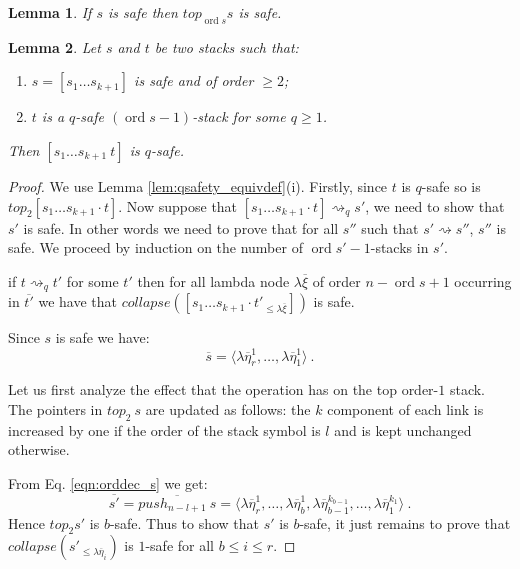 \documentclass{article}
\newcommand{\ord}{\mathop{\mathrm{ord}}}
\newcommand{\prefixof}{\leqslant}
\newtheorem{lemma}{Lemma}[section]
\theoremstyle{remark}
\theoremstyle{definition}
\newcommand\orddec\overline
\newcommand\saferel\rightsquigarrow
\begin{document}
\begin{lemma}
\label{lem:top_qsafe} If $s$ is safe then $top_{\ord{s}} s$ is safe.
\end{lemma}

\begin{lemma}
\label{lem:cons_qsafety} Let $s$ and $t$ be two stacks such that:
\begin{enumerate}[1.]
\item $s = [s_1 \ldots s_{k+1}]$ is safe and of order $\geq 2$;
\item $t$ is a $q$-safe $(\ord{s}-1)$-stack for some $q\geq1$.
\end{enumerate}
Then $[s_1 \ldots s_{k+1}~ t]$ is $q$-safe.
\end{lemma}
\begin{proof}
We use Lemma \ref{lem:qsafety_equivdef}(i). Firstly, since $t$ is
$q$-safe so is $top_2 [s_1 \ldots s_{k+1} \cdot t]$. Now suppose
that $[s_1 \ldots s_{k+1} \cdot t] \saferel_q s'$, we need to show
that $s'$ is safe. In other words we need to prove that for all
$s''$ such that $s' \saferel s''$, $s''$ is safe. We proceed by
induction on the number of $\ord{s'}-1$-stacks in $s'$.

\hrulefill

 if $t\saferel_q t'$ for some $t'$ then for all lambda node
$\lambda \overline{\xi}$ of order $n-\ord{s}+1$ occurring in
$\orddec{t'}$ we have that $collapse([s_1 \ldots s_{k+1} \cdot
t'_{\prefixof{\lambda \overline{\xi}}}])$ is safe.


\hrulefill

Since $s$ is safe we have:
\begin{equation}
 \orddec{s} = \langle \lambda \overline{\eta}_r^1
, \ldots, \lambda \overline{\eta}_1^1   \rangle \ . \label{eqn:orddec_s}
\end{equation}

Let us first analyze the effect that the operation has on the top
order-$1$ stack. The pointers in $top_2\ s$ are updated as follows:
the $k$ component of each link is increased by one if the order of
the stack symbol is $l$ and is kept unchanged otherwise.

From Eq. \ref{eqn:orddec_s} we get:
\begin{equation}
\orddec{s'} = \orddec{push_{n-l+1}\ s} = \langle
\lambda \overline{\eta}_r^1
, \ldots,  \lambda \overline{\eta}_{b}^1, \lambda \overline{\eta}_{b-1}^{k_{b-1}}, \ldots,
 \lambda \overline{\eta}_1^{k_{1}} \rangle
\ . \label{eqn:orddec_pushj_s}
\end{equation}
Hence $top_2 s'$ is $b$-safe. Thus to show that $s'$ is $b$-safe, it
just remains to prove that $collapse(s'_{\prefixof \lambda
\overline{\eta}_{i}})$ is $1$-safe for all $b \leq i \leq r$.


\end{proof}
\end{document}
